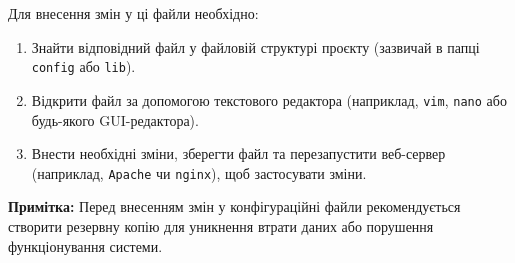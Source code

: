 \documentclass[14pt,a4paper]{article}
\begin{document}
\begin{large}
Для внесення змін у ці файли необхідно:
\begin{enumerate}
    \item Знайти відповідний файл у файловій структурі проєкту (зазвичай в папці \texttt{config} або \texttt{lib}).
    \item Відкрити файл за допомогою текстового редактора (наприклад, \texttt{vim}, \texttt{nano} або будь-якого GUI-редактора).
    \item Внести необхідні зміни, зберегти файл та перезапустити веб-сервер (наприклад, \texttt{Apache} чи \texttt{nginx}), щоб застосувати зміни.
\end{enumerate}

\textbf{Примітка:} Перед внесенням змін у конфігураційні файли рекомендується створити резервну копію для уникнення втрати даних або порушення функціонування системи.


\end{large}
\end{document}
